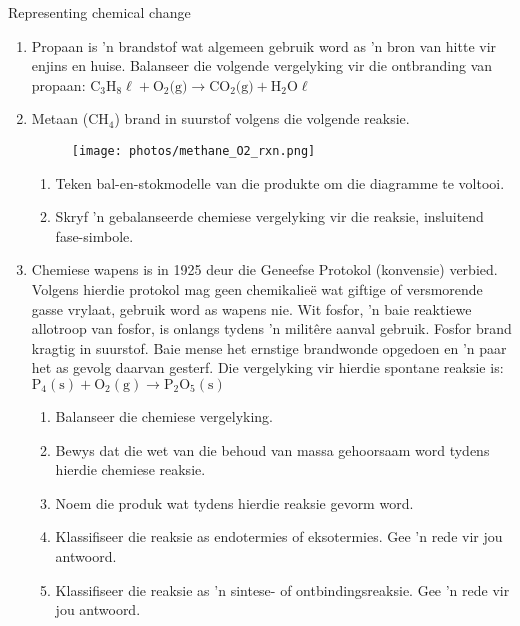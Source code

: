 \begin{eocexercises}{Representing chemical change}
            \nopagebreak
\begin{enumerate}[noitemsep, label=\textbf{\arabic*}. ] 

\item Propaan is 'n brandstof wat algemeen gebruik word as 'n bron van hitte vir enjins en huise. Balanseer die volgende vergelyking vir die ontbranding van propaan:
${\text{C}}_{3}{\text{H}}_{8} \ell + \text{O}_{2} \text{(g)} \to \text{CO}_{2} \text{(g)} + \text{H}_{2}\text{O} \ell$

\item Metaan ($\text{CH}_{4}$) brand in suurstof volgens die volgende reaksie. \\
\begin{figure}[H]
\begin{center}
 \texttt{[image: photos/methane\_O2\_rxn.png]}
\end{center}
\end{figure}

\begin{enumerate}[noitemsep, label=\textbf{\alph*}.]
 \item Teken bal-en-stokmodelle van die produkte om die diagramme te voltooi.
\item Skryf 'n gebalanseerde chemiese vergelyking vir die reaksie, insluitend fase-simbole.
\end{enumerate}

\item Chemiese wapens is in 1925 deur die Geneefse Protokol (konvensie) verbied. Volgens hierdie protokol mag geen chemikalieë wat giftige of versmorende gasse vrylaat, gebruik word as wapens nie. Wit fosfor, 'n baie reaktiewe allotroop van fosfor, is onlangs tydens 'n milit\^{e}re aanval gebruik. Fosfor brand kragtig in suurstof. Baie mense het ernstige brandwonde opgedoen en 'n paar het as gevolg daarvan gesterf. Die vergelyking vir hierdie spontane reaksie is:
        ${\text{P}}_{4}\left(\text{s}\right)+{\text{O}}_{2}\left(\text{g}\right)\to {\text{P}}_{2}{\text{O}}_{5}\left(\text{s}\right)$

    \begin{enumerate}[noitemsep, label=\textbf{\alph*}. ] 
    \item Balanseer die chemiese vergelyking.
    \item Bewys dat die wet van die behoud van massa gehoorsaam word tydens hierdie chemiese reaksie.
    \item Noem die produk wat tydens hierdie reaksie gevorm word.
    \item Klassifiseer die reaksie as endotermies of eksotermies. Gee 'n rede vir jou antwoord.
    \item Klassifiseer die reaksie as 'n sintese- of ontbindingsreaksie. Gee 'n rede vir jou antwoord.
    \end{enumerate}


\end{enumerate}
\end{eocexercises}
